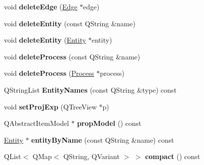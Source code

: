 \begin{DoxyCompactItemize}
\mbox{\label{class_graph_widget_af79a21281cca11afbb994604270a0fe7}} 
void {\bfseries delete\+Edge} (\hyperlink{class_edge}{Edge} $\ast$edge)
\item 
\mbox{\label{class_graph_widget_aedb11a4a9823bfb499e3d88ca1aa4ac6}} 
void {\bfseries delete\+Entity} (const Q\+String \&name)
\item 
\mbox{\label{class_graph_widget_a1bd878d346b1b1f0a1f7a746b82d925b}} 
void {\bfseries delete\+Entity} (\hyperlink{class_entity}{Entity} $\ast$entity)
\item 
\mbox{\label{class_graph_widget_a77a080507badb848604891706b3e5fdb}} 
void {\bfseries delete\+Process} (const Q\+String \&name)
\item 
\mbox{\label{class_graph_widget_a87068066b6177b8cd38f6bbdc01395b1}} 
void {\bfseries delete\+Process} (\hyperlink{class_process}{Process} $\ast$process)
\item 
\mbox{\label{class_graph_widget_a81930cfac993a5c68472af7075e3497e}} 
Q\+String\+List {\bfseries Entity\+Names} (const Q\+String \&type) const
\item 
\mbox{\label{class_graph_widget_a47411c5a99d9e61573d62fc8aac3df89}} 
void {\bfseries set\+Proj\+Exp} (Q\+Tree\+View $\ast$p)
\item 
\mbox{\label{class_graph_widget_a00f97f7d5b40070eabe75ab6d942d29a}} 
Q\+Abstract\+Item\+Model $\ast$ {\bfseries prop\+Model} () const
\item 
\mbox{\label{class_graph_widget_a49856df1e5d61b7a18a708d4500d5f1f}} 
\hyperlink{class_entity}{Entity} $\ast$ {\bfseries entity\+By\+Name} (const Q\+String \&name) const
\item 
\mbox{\label{class_graph_widget_a2eb58954dcd1f34e2282ea2493ab729d}} 
Q\+List$<$ Q\+Map$<$ Q\+String, Q\+Variant $>$ $>$ {\bfseries compact} () const
\item 
\mbox{\label{class_graph_widget_a2756c3611af9cca2dec78b2a39f240d0}} 

\end{DoxyCompactItemize}
